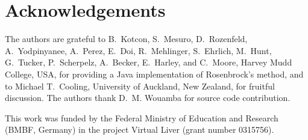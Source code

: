 \documentclass[10pt]{bmc_article}
\newenvironment{bmcformat}{\baselineskip20pt\sloppy\setboolean{publ}{false}}{\baselineskip20pt\sloppy}
\begin{document}
\begin{bmcformat}
\section*{Acknowledgements}
The authors are grateful to B.~Kotcon, S.~Mesuro, D.~Rozenfeld, A.~Yodpinyanee,
A.~Perez, E.~Doi, R.~Mehlinger, S.~Ehrlich, M.~Hunt, G.~Tucker, P.~Scherpelz,
A.~Becker, E.~Harley, and C.~Moore, Harvey Mudd College, USA, for providing a
Java implementation of Rosenbrock's method, and to Michael T.~Cooling,
University of Auckland, New Zealand, for fruitful discussion. The authors thank
D.~M. Wouamba for source code contribution.

This work was funded by the Federal Ministry of Education and Research (BMBF,
Germany) in the project Virtual Liver (grant number 0315756).
 

\newpage
{
   }     %





\end{bmcformat}
\end{document}
